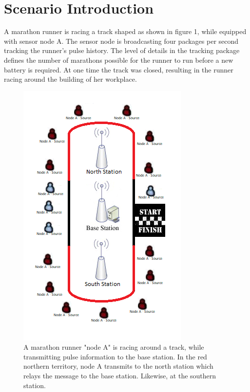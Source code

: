 \section{Scenario Introduction}\label{sc:scenarioIntroduction}
A marathon runner is racing a track shaped as shown in figure 1, while equipped with sensor node A. The sensor node is broadcasting four packages per second tracking the runner’s pulse history. The level of details in the tracking package defines the number of marathons possible for the runner to run before a new battery is required. At one time the track was closed, resulting in the runner racing around the building of her workplace.

\begin{figure}[H]
	\centering
	\includegraphics[width=\linewidth]{introduction/scenario/fig/scenarioIntroduction.png}
	\caption{A marathon runner "node A" is racing around a track, while transmitting pulse information to the base station. In the red northern territory, node A transmits to the north station which relays the message to the base station. Likewise, at the southern station.}
	\label{fig:scenarioIntroduction}
\end{figure}

